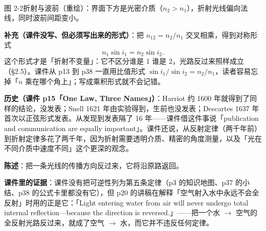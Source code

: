 \documentclass[11pt]{ctexart}
\begin{document}
\begin{center}\begin{minipage}{0.97\linewidth}\centering
{}\\
{\small 图 2-2\quad 折射与波前（重绘）：界面下方是光密介质（$n_2>n_1$），折射光线偏向法线，同时波前间距变小。}
\end{minipage}\end{center}

\textbf{补充（课件没写、但必须写出来的形式）}：把 $n_{12}=n_2/n_1$ 交叉相乘，得到对称形式
\[
n_1\sin i_1=n_2\sin i_2 .
\]
这个形式才是「折射不变量」：它不区分谁是 1 谁是 2，光路反过来照样成立（§2.5）。课件从 p13 到 p38 一直用比值形式 $\sin i_1/\sin i_2=n_2/n_1$，读者容易忘掉「$n$ 乘在哪个角上」；写成乘积形式就不会记错。

\textbf{历史（课件 p15「One Law, Three Names」）}：Harriot 约 1600 年就得到了同样的结论，没发表；Snell 1621 年由实验得到，生前也没发表；Descartes 1637 年首次以正弦形式发表。从发现到发表隔了 16 年——课件借这件事说「publication and communication are equally important」。课件还说，从反射定律（两千年前）到折射定律多花了两千年，因为折射需要透明介质、精密的角度测量，以及「光在不同介质中速度不同」这个更深的观念。

\textbf{陈述}：把一条光线的传播方向反过来，它将沿原路返回。

\textbf{课件里的证据}：课件没有把可逆性列为第五条定律（p3 的知识地图、p37 的小结、p38 的公式卡里都没有它），但 p20 的讲稿在解释「空气射入水中永远不会全反射」时用的正是它：「Light entering water from air will never undergo total internal reflection---because the direction is reversed.」——把一个水 $\rightarrow$ 空气的全反射光路反过来，就成了空气 $\rightarrow$ 水，而它并不违反任何定律。
\end{document}
